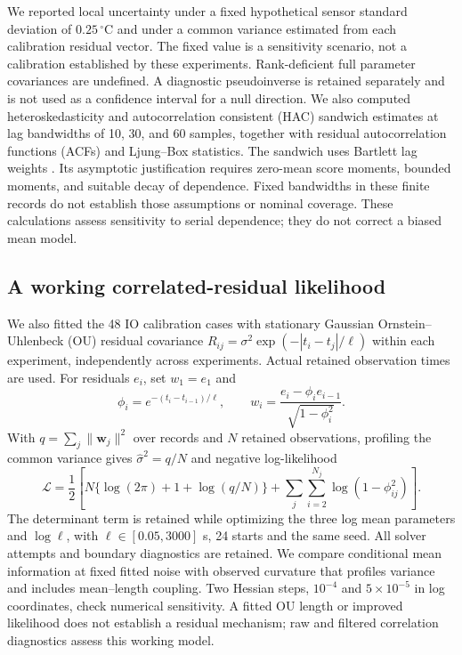 \documentclass[11pt]{article}
\begin{document}
We reported local uncertainty under a fixed hypothetical sensor standard
deviation of $0.25\,{}^\circ\mathrm C$ and under a common variance estimated
from each calibration residual vector. The fixed value is a sensitivity scenario,
not a calibration established by these experiments. Rank-deficient full parameter
covariances are undefined. A diagnostic pseudoinverse is retained separately and
is not used as a confidence interval for a null direction. We also computed
heteroskedasticity and autocorrelation consistent (HAC) sandwich estimates at lag
bandwidths of 10, 30, and 60 samples, together with residual autocorrelation
functions (ACFs) and Ljung--Box statistics. The sandwich uses Bartlett lag weights
\citep{newey-1987-simple}. Its asymptotic justification requires zero-mean score
moments, bounded moments, and suitable decay of dependence. Fixed bandwidths
in these finite records do not establish those assumptions or nominal coverage.
These calculations assess sensitivity to
serial dependence; they do not correct a biased mean model.

\subsection{A working correlated-residual likelihood}
We also fitted the 48 IO calibration cases with stationary Gaussian
Ornstein--Uhlenbeck (OU) residual
covariance $R_{ij}=\sigma^2\exp(-|t_i-t_j|/\ell)$ within each experiment,
independently across experiments. Actual retained observation times are used.
For residuals $e_i$, set $w_1=e_1$ and
\[
 \phi_i=e^{-(t_i-t_{i-1})/\ell},\qquad
 w_i=\frac{e_i-\phi_i e_{i-1}}{\sqrt{1-\phi_i^2}}.
\]
With $q=\sum_j\|\bm w_j\|^2$ over records and $N$ retained observations,
profiling the common variance gives $\hat\sigma^2=q/N$ and negative
log-likelihood
\[
 \mathcal L=\frac12\left[
 N\{\log(2\pi)+1+\log(q/N)\}
 +\sum_j\sum_{i=2}^{N_j}\log(1-\phi_{ij}^2)\right].
\]
The determinant term is retained while optimizing the three log mean parameters
and $\log\ell$, with $\ell\in[0.05,3000]$ s, 24 starts and the same seed.
All solver attempts and boundary diagnostics are retained. We compare
conditional mean information at fixed fitted noise with observed curvature
that profiles variance and includes mean--length coupling. Two Hessian steps,
$10^{-4}$ and $5\times10^{-5}$ in log coordinates, check numerical sensitivity.
A fitted OU length or improved likelihood does not establish a residual
mechanism; raw and filtered correlation diagnostics assess this working model.
\end{document}
